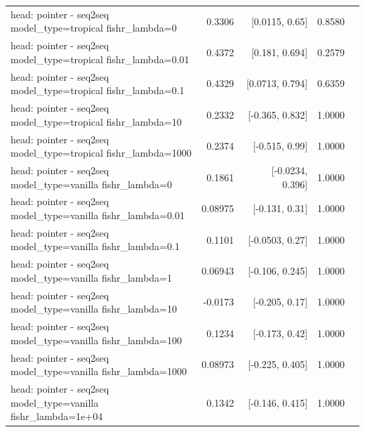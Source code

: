\documentclass[10pt]{article}
\makeatletter
\newcommand{\stackcell}[1]{\begin{tabular}[t]{@{}l@{}}#1\end{tabular}}
\makeatother
\begin{document}
{\begin{longtable}{lrrrl}
\stackcell{head: pointer - seq2seq\\\footnotesize model\_type=tropical fishr\_lambda=0 } & 0.3306 & [0.0115, 0.65] & 0.8580 & \\
\stackcell{head: pointer - seq2seq\\\footnotesize model\_type=tropical fishr\_lambda=0.01 } & 0.4372 & [0.181, 0.694] & 0.2579 & \\
\stackcell{head: pointer - seq2seq\\\footnotesize model\_type=tropical fishr\_lambda=0.1 } & 0.4329 & [0.0713, 0.794] & 0.6359 & \\
\stackcell{head: pointer - seq2seq\\\footnotesize model\_type=tropical fishr\_lambda=10 } & 0.2332 & [-0.365, 0.832] & 1.0000 & \\
\stackcell{head: pointer - seq2seq\\\footnotesize model\_type=tropical fishr\_lambda=1000 } & 0.2374 & [-0.515, 0.99] & 1.0000 & \\
\stackcell{head: pointer - seq2seq\\\footnotesize model\_type=vanilla fishr\_lambda=0 } & 0.1861 & [-0.0234, 0.396] & 1.0000 & \\
\stackcell{head: pointer - seq2seq\\\footnotesize model\_type=vanilla fishr\_lambda=0.01 } & 0.08975 & [-0.131, 0.31] & 1.0000 & \\
\stackcell{head: pointer - seq2seq\\\footnotesize model\_type=vanilla fishr\_lambda=0.1 } & 0.1101 & [-0.0503, 0.27] & 1.0000 & \\
\stackcell{head: pointer - seq2seq\\\footnotesize model\_type=vanilla fishr\_lambda=1 } & 0.06943 & [-0.106, 0.245] & 1.0000 & \\
\stackcell{head: pointer - seq2seq\\\footnotesize model\_type=vanilla fishr\_lambda=10 } & -0.0173 & [-0.205, 0.17] & 1.0000 & \\
\stackcell{head: pointer - seq2seq\\\footnotesize model\_type=vanilla fishr\_lambda=100 } & 0.1234 & [-0.173, 0.42] & 1.0000 & \\
\stackcell{head: pointer - seq2seq\\\footnotesize model\_type=vanilla fishr\_lambda=1000 } & 0.08973 & [-0.225, 0.405] & 1.0000 & \\
\stackcell{head: pointer - seq2seq\\\footnotesize model\_type=vanilla fishr\_lambda=1e+04 } & 0.1342 & [-0.146, 0.415] & 1.0000 & \\
\bottomrule
\end{longtable}
}
\end{document}

